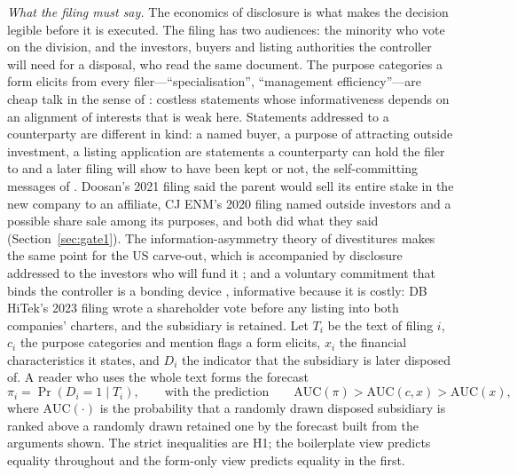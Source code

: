\emph{What the filing must say.} The economics of disclosure is what makes the decision legible before it is executed. The filing has two audiences: the minority who vote on the division, and the investors, buyers and listing authorities the controller will need for a disposal, who read the same document. The purpose categories a form elicits from every filer---``specialisation'', ``management efficiency''---are cheap talk in the sense of : costless statements whose informativeness depends on an alignment of interests that is weak here. Statements addressed to a counterparty are different in kind: a named buyer, a purpose of attracting outside investment, a listing application are statements a counterparty can hold the filer to and a later filing will show to have been kept or not, the self-committing messages of . Doosan's 2021 filing said the parent would sell its entire stake in the new company to an affiliate, CJ ENM's 2020 filing named outside investors and a possible share sale among its purposes, and both did what they said (Section~\ref{sec:gate1}). The information-asymmetry theory of divestitures makes the same point for the US carve-out, which is accompanied by disclosure addressed to the investors who will fund it \cite{nanda1991, krishnaswami1999}; and a voluntary commitment that binds the controller is a bonding device \cite{jensen1976}, informative because it is costly: DB HiTek's 2023 filing wrote a shareholder vote before any listing into both companies' charters, and the subsidiary is retained. Let $T_i$ be the text of filing $i$, $c_i$ the purpose categories and mention flags a form elicits, $x_i$ the financial characteristics it states, and $D_i$ the indicator that the subsidiary is later disposed of. A reader who uses the whole text forms the forecast
\begin{equation}\label{eq:posterior}
\pi_i = \Pr(D_i = 1 \mid T_i), \qquad \text{with the prediction} \qquad \mathrm{AUC}(\pi) > \mathrm{AUC}(c, x) > \mathrm{AUC}(x),
\end{equation}
where $\mathrm{AUC}(\cdot)$ is the probability that a randomly drawn disposed subsidiary is ranked above a randomly drawn retained one by the forecast built from the arguments shown. The strict inequalities are H1; the boilerplate view predicts equality throughout and the form-only view predicts equality in the first.

